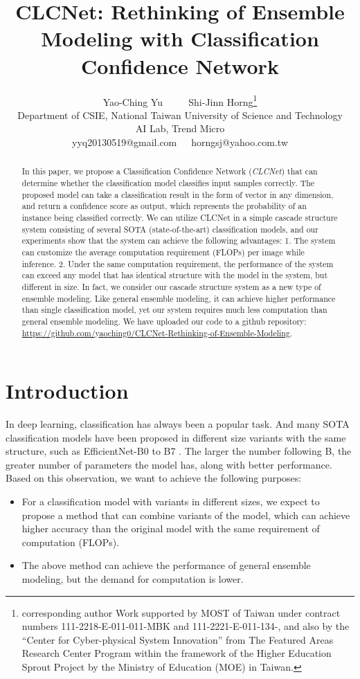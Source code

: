 \documentclass{article}
\title{CLCNet: Rethinking of Ensemble Modeling with Classification Confidence Network}
\author{Yao-Ching Yu  ~~~~  Shi-Jinn Horng\thanks{\scriptsize corresponding author\newline \hspace*{1.6em} Work supported by MOST of Taiwan under contract numbers 111-2218-E-011-011-MBK and 111-2221-E-011-134-, and also by the “Center for Cyber-physical System Innovation” from The Featured Areas Research Center Program within the framework of the Higher Education Sprout Project by the Ministry of Education (MOE) in Taiwan.} \vspace{0.5 em}\\
  Department of CSIE, National Taiwan University of Science and Technology \\
  AI Lab, Trend Micro \\
  yyq20130519@gmail.com~~~horngsj@yahoo.com.tw \\
}
\begin{document}
\maketitle


\begin{abstract}
In this paper, we propose a Classification Confidence Network (\emph{CLCNet}) that can determine whether the classification model classifies input samples correctly. The proposed model can take a classification result in the form of vector in any dimension, and return a confidence score as output, which represents the probability of an instance being classified correctly. We can utilize CLCNet in a simple cascade structure system consisting of several SOTA (state-of-the-art) classification models, and our experiments show that the system can achieve the following advantages: 1. The system can customize the average computation requirement (FLOPs) per image while inference. 2. Under the same computation requirement, the performance of the system can exceed any model that has identical structure with the model in the system, but different in size. In fact, we consider our cascade structure system as a new type of ensemble modeling. Like general ensemble modeling, it can achieve higher performance than single classification model, yet our system requires much less computation than general ensemble modeling. We have uploaded our code to a github repository: \href{https://github.com/yaoching0/CLCNet-Rethinking-of-Ensemble-Modeling}{https://github.com/yaoching0/CLCNet-Rethinking-of-Ensemble-Modeling}.
\end{abstract}


\section{Introduction}

In deep learning, classification \cite{yuan2021volo,liu2022convnet,brock2021high,tan2021efficientnetv2} has always been a popular task. And many SOTA classification models have been proposed in different size variants with the same structure, such as EfficientNet-B0 to B7 \cite{tan2019efficientnet}. The larger the number following B, the greater number of parameters the model has, along with better performance. Based on this observation, we want to achieve the following purposes: 
\begin{itemize}

\item For a classification model with variants in different sizes, we expect to propose a method that can combine variants of the model, which can achieve higher accuracy than the original model with the same requirement of computation (FLOPs).
\item The above method can achieve the performance of general ensemble modeling, but the demand for computation is lower.
\end{itemize}
\end{document}
